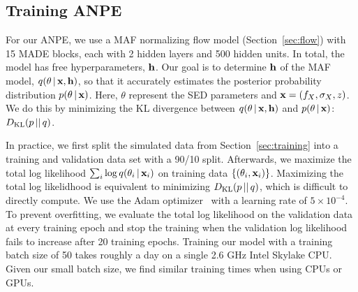\subsection{Training ANPE} \label{sec:anpe_train}
For our ANPE, we use a MAF normalizing flow model (Section~\ref{sec:flow}) with 
15 MADE blocks, each with 2 hidden layers and 500 hidden units.
In total, the model has  free hyperparameters, ${\bf h}$. 
Our goal is to determine ${\bf h}$ of the MAF model, 
$q(\theta\,|\, {\bf x}, {\bf h})$, so that it accurately estimates the
posterior probability distribution $p(\theta\,|\, {\bf x})$. 
Here, $\theta$ represent the SED parameters and ${\bf x} = (f_X, \sigma_X, z)$.
We do this by minimizing the KL divergence between 
$q(\theta\,|\,{\bf x}, {\bf h})$ and $p(\theta\,|\,{\bf x})$:
$D_{\rm KL} (p\,||\,q)$. 

In practice, we first split the simulated data from Section~\ref{sec:training}
into a training and validation data set with a 90/10 split. 
Afterwards, we maximize the total log likelihood $\sum_i \log q(\theta_i\,|\,
{\bf x}_i)$ on training data $\{(\theta_i, {\bf x}_i)\}$. 
Maximizing the total log likelidhood is equivalent to minimizing 
$D_{\rm KL} (p\,||\,q)$, which is difficult to directly compute.
We use the {\sc Adam} optimizer~\citep{kingma2017} with a learning rate of $5\times10^{-4}$. 
To prevent overfitting, we evaluate the total log likelihood on the validation
data at every training epoch and stop the training when the validation log
likelihood fails to increase after 20 training epochs.  
Training our model with a training batch size of 50 takes roughly a day on a
single 2.6 GHz Intel Skylake CPU. 
Given our small batch size, we find similar training times when using CPUs or
GPUs. 
